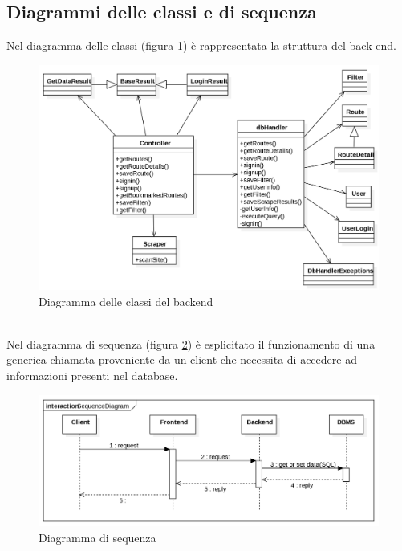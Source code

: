 \documentclass[11pt]{report}
\begin{document}
\subsection{Diagrammi delle classi e di sequenza}
Nel diagramma delle classi (figura \ref{class_diagram_backend}) è rappresentata la struttura del back-end.
\begin{figure}
	\centering
	\includegraphics[scale=0.45]{ClassDiagram_Backend}
	\caption{Diagramma delle classi del backend \label{class_diagram_backend}}
\end{figure}
\\Nel diagramma di sequenza (figura \ref{sequence_diagram}) è esplicitato il funzionamento di una generica chiamata proveniente da un client che necessita di accedere ad informazioni presenti nel database.
\begin{figure}
	\centering
	\includegraphics[scale=0.45]{SequenceDiagram}
	\caption{Diagramma di sequenza \label{sequence_diagram}}
\end{figure}
\end{document}
